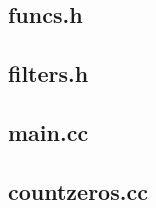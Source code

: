   \subsection{funcs.h}
    
	\subsection{filters.h}
    
  \subsection{main.cc}
    
  \subsection{countzeros.cc}
    
